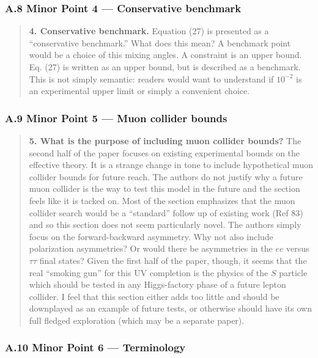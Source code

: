 \documentclass[
  chinese,
  UTF8]{ctexart}
\begin{document}
\subsubsection{A.8 Minor Point 4 --- Conservative
benchmark}\label{a.8-minor-point-4-conservative-benchmark}

\begin{quote}
\textbf{4. Conservative benchmark.} Equation (27) is presented as a
``conservative benchmark.'' What does this mean? A benchmark point would
be a choice of this mixing angles. A constraint is an upper bound. Eq.
(27) is written as an upper bound, but is described as a benchmark. This
is not simply semantic: readers would want to understand if \(10^{-2}\)
is an experimental upper limit or simply a convenient choice.
\end{quote}

\subsubsection{A.9 Minor Point 5 --- Muon collider
bounds}\label{a.9-minor-point-5-muon-collider-bounds}

\begin{quote}
\textbf{5. What is the purpose of including muon collider bounds?} The
second half of the paper focuses on existing experimental bounds on the
effective theory. It is a strange change in tone to include hypothetical
muon collider bounds for future reach. The authors do not justify why a
future muon collider is the way to test this model in the future and the
section feels like it is tacked on. Most of the section emphasizes that
the muon collider search would be a ``standard'' follow up of existing
work (Ref 83) and so this section does not seem particularly novel. The
authors simply focus on the forward-backward asymmetry. Why not also
include polarization asymmetries? Or would there be asymmetries in the
\(ee\) versus \(\tau\tau\) final states? Given the first half of the
paper, though, it seems that the real ``smoking gun'' for this UV
completion is the physics of the \(S\) particle which should be tested
in any Higgs-factory phase of a future lepton collider. I feel that this
section either adds too little and should be downplayed as an example of
future tests, or otherwise should have its own full fledged exploration
(which may be a separate paper).
\end{quote}

\subsubsection{A.10 Minor Point 6 ---
Terminology}\label{a.10-minor-point-6-terminology}
\end{document}
